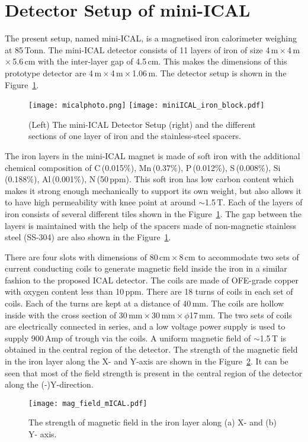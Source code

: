 \section{Detector Setup of mini-ICAL}
The present setup, named mini-ICAL, is a magnetised iron calorimeter
weighing at 85\,Tonn. The mini-ICAL detector consists of 11 layers
of iron of size 4\,m\,$\times$\,4\,m\,$\times$\,5.6\,cm with the
inter-layer gap of 4.5\,cm. This makes the dimensions of this
prototype detector are 4\,m\,$\times$\,4\,m\,$\times$\,1.06\,m.
The detector setup is shown in the Figure~\ref{fig:miniICAL_iron}.
\begin{figure}[h]
  \centering
  \texttt{[image: micalphoto.png]}
  \texttt{[image: miniICAL\_iron\_block.pdf]}
  \caption{(Left) The mini-ICAL Detector Setup (right) and the
    different sections of one layer of iron and the stainless-steel
    spacers.}
  \label{fig:miniICAL_iron}
\end{figure}
The iron layers in the mini-ICAL magnet is made of soft iron with
the additional chemical composition of C\,(0.015\%), Mn\,(0.37\%),
P\,(0.012\%), S\,(0.008\%), Si\,(0.188\%), Al\,(0.001\%), N\,(50\,ppm).
This soft iron has low carbon content which makes it strong enough
mechanically to support its own weight, but also allows it to have high
permeability with knee point at around $\sim$1.5\,T.
Each of the layers of iron consists of several different tiles shown
in the Figure~\ref{fig:miniICAL_iron}.
The gap between the layers is maintained with the help of the spacers
made of non-magnetic stainless steel (SS-304) are also shown in the
Figure~\ref{fig:miniICAL_iron}.

There are four slots with dimensions of 80\,cm\,$\times$\,8\,cm to
accommodate two sets of current conducting coils to generate magnetic
field inside the iron in a similar fashion to the proposed
ICAL detector. The coils are made of OFE-grade copper with
oxygen content less than 10\,ppm. There are 18 turns of coils in each
set of coils. Each of the turns are kept at a distance of 40\,mm.
The coils are hollow inside with the cross section of
30\,mm\,$\times$\,30\,mm\,$\times$\,$\phi$17\,mm.
The two sets of coils are electrically connected in series,
and a low voltage power supply is used to supply 900\,Amp
of trough via the coils. A uniform magnetic field of $\sim$1.5\,T
is obtained in the central region of the detector.
The strength of the magnetic field in the iron layer along the X- and
Y-axis are shown in the Figure~\ref{fig:magfieldmical}. It can be seen
that most of the field strength is present in the central region of the
detector along the (-)Y-direction.
\begin{figure}[h]
  \centering
  \texttt{[image: mag\_field\_mICAL.pdf]}
  \caption{The strength of magnetic field in the iron layer along
    (a) X- and (b) Y- axis.}
  \label{fig:magfieldmical}
\end{figure}

